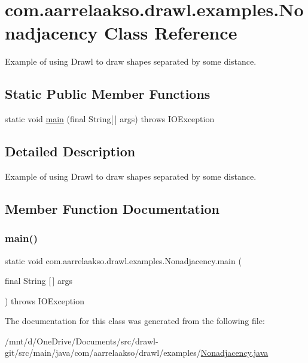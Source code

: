 \hypertarget{classcom_1_1aarrelaakso_1_1drawl_1_1examples_1_1_nonadjacency}{}\section{com.\+aarrelaakso.\+drawl.\+examples.\+Nonadjacency Class Reference}
\label{classcom_1_1aarrelaakso_1_1drawl_1_1examples_1_1_nonadjacency}


Example of using Drawl to draw shapes separated by some distance.  


\subsection*{Static Public Member Functions}
\begin{DoxyCompactItemize}
\item 
static void \hyperlink{classcom_1_1aarrelaakso_1_1drawl_1_1examples_1_1_nonadjacency_a07a43cbfddf1eff05acb1643d29f8ccf}{main} (final String\mbox{[}$\,$\mbox{]} args)  throws I\+O\+Exception     
\end{DoxyCompactItemize}


\subsection{Detailed Description}
Example of using Drawl to draw shapes separated by some distance. 

\subsection{Member Function Documentation}
\mbox{\label{classcom_1_1aarrelaakso_1_1drawl_1_1examples_1_1_nonadjacency_a07a43cbfddf1eff05acb1643d29f8ccf}} 
\subsubsection{\texorpdfstring{main()}{main()}}
{\footnotesize\ttfamily static void com.\+aarrelaakso.\+drawl.\+examples.\+Nonadjacency.\+main (\begin{DoxyParamCaption}\item[{final String \mbox{[}$\,$\mbox{]}}]{args }\end{DoxyParamCaption}) throws I\+O\+Exception\hspace{0.3cm}{\ttfamily [static]}}



The documentation for this class was generated from the following file\+:\begin{DoxyCompactItemize}
\item 
/mnt/d/\+One\+Drive/\+Documents/src/drawl-\/git/src/main/java/com/aarrelaakso/drawl/examples/\hyperlink{_nonadjacency_8java}{Nonadjacency.\+java}\end{DoxyCompactItemize}
